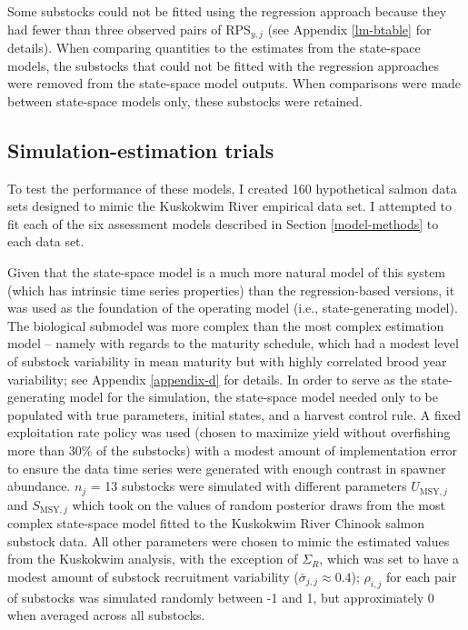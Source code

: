 \documentclass[12pt,]{book}
\theoremstyle{definition}
\theoremstyle{definition}
\theoremstyle{definition}
\theoremstyle{remark}
\begin{document}
Some substocks could not be fitted using the regression approach because
they had fewer than three observed pairs of \(\text{RPS}_{y,j}\) (see
Appendix \ref{lm-btable} for details). When comparing quantities to the
estimates from the state-space models, the substocks that could not be
fitted with the regression approaches were removed from the state-space
model outputs. When comparisons were made between state-space models
only, these substocks were retained.

\subsection{Simulation-estimation
trials}\label{simulation-estimation-trials}

\noindent
To test the performance of these models, I created 160 hypothetical
salmon data sets designed to mimic the Kuskokwim River empirical data
set. I attempted to fit each of the six assessment models described in
Section \ref{model-methods} to each data set.

Given that the state-space model is a much more natural model of this
system (which has intrinsic time series properties) than the
regression-based versions, it was used as the foundation of the
operating model (i.e., state-generating model). The biological submodel
was more complex than the most complex estimation model -- namely with
regards to the maturity schedule, which had a modest level of substock
variability in mean maturity but with highly correlated brood year
variability; see Appendix \ref{appendix-d} for details. In order to
serve as the state-generating model for the simulation, the state-space
model needed only to be populated with true parameters, initial states,
and a harvest control rule. A fixed exploitation rate policy was used
(chosen to maximize yield without overfishing more than 30\% of the
substocks) with a modest amount of implementation error to ensure the
data time series were generated with enough contrast in spawner
abundance. \(n_j\) = 13 substocks were simulated with different
parameters \(U_{\text{MSY},j}\) and \(S_{\text{MSY},j}\) which took on
the values of random posterior draws from the most complex state-space
model fitted to the Kuskokwim River Chinook salmon substock data. All
other parameters were chosen to mimic the estimated values from the
Kuskokwim analysis, with the exception of \(\Sigma_R\), which was set to
have a modest amount of substock recruitment variability
(\(\bar{\sigma}_{j,j} \approx 0.4\)); \(\rho_{i,j}\) for each pair of
substocks was simulated randomly between -1 and 1, but approximately 0
when averaged across all substocks.
\end{document}
